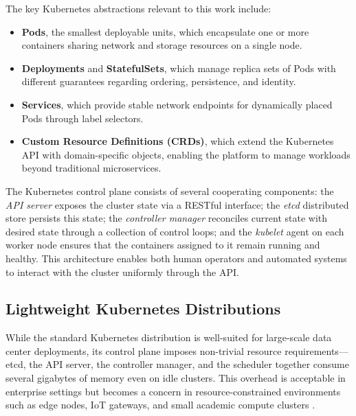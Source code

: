The key Kubernetes abstractions relevant to this work include:

\begin{itemize}
  \item \textbf{Pods}, the smallest deployable units, which encapsulate one or more containers sharing network and storage resources on a single node.
  \item \textbf{Deployments} and \textbf{StatefulSets}, which manage replica sets of Pods with different guarantees regarding ordering, persistence, and identity.
  \item \textbf{Services}, which provide stable network endpoints for dynamically placed Pods through label selectors.
  \item \textbf{Custom Resource Definitions (CRDs)}, which extend the Kubernetes API with domain-specific objects, enabling the platform to manage workloads beyond traditional microservices.
\end{itemize}

The Kubernetes control plane consists of several cooperating components: the \emph{API server} exposes the cluster state via a RESTful interface; the \emph{etcd} distributed store persists this state; the \emph{controller manager} reconciles current state with desired state through a collection of control loops; and the \emph{kubelet} agent on each worker node ensures that the containers assigned to it remain running and healthy. This architecture enables both human operators and automated systems to interact with the cluster uniformly through the API.


\subsection{Lightweight Kubernetes Distributions}

While the standard Kubernetes distribution is well-suited for large-scale data center deployments, its control plane imposes non-trivial resource requirements---etcd, the API server, the controller manager, and the scheduler together consume several gigabytes of memory even on idle clusters. This overhead is acceptable in enterprise settings but becomes a concern in resource-constrained environments such as edge nodes, IoT gateways, and small academic compute clusters \citep{yakubov2025comparative}.

